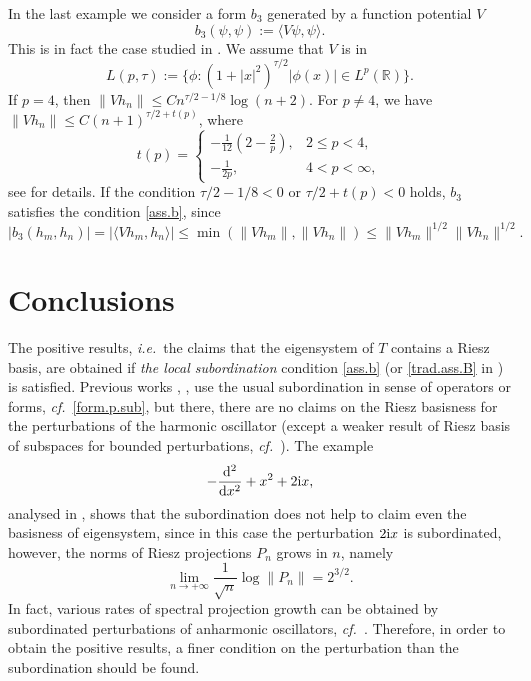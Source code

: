 In the last example we consider a form $b_3$ generated by a function potential $V$
\begin{equation}\label{V.form}
b_3(\psi,\psi):=\langle V \psi, \psi \rangle.
\end{equation}
This is in fact the case studied in \cite{Adduci-2012-10}. We assume that $V$ is in
\begin{equation*}
 L(p,\tau):= \{\phi:(1+|x|^2)^{\tau/2}|\phi(x)| \in L^p({{\mathbb{R}}}) \}.
\end{equation*}
If $p=4$, then $\|V h_n \| \leq C n^{\tau/2-1/8} \log(n+2)$. For $p\neq 4$, we have
$\|V h_n \| \leq C (n+1)^{\tau/2+t(p)}$, where
\begin{equation*}
t(p) = 
\begin{cases}
-\frac{1}{12}(2-\frac{2}{p}), & 2 \leq p <4, \\
-\frac{1}{2p}, & 4<p<\infty,
\end{cases}
\end{equation*}
see \cite[Eq.(2), Lem.5.2]{Adduci-2012-10} for details. 
If the condition $\tau/2-1/8<0$ or $\tau/2 +t(p)<0$ holds, $b_3$ satisfies the condition \eqref{ass.b}, since
\begin{equation}\label{V.form.bound}
|b_3(h_m,h_n)| = |\langle V h_m, h_n \rangle| 
\leq 
\min (\|V h_m\|,\|V h_n\|)
\leq
\|V h_m\|^{1/2} \|V h_n\|^{1/2}
.
\end{equation}

\section{Conclusions}
\label{sec.concl}

The positive results, {{\emph{i.e.}}}~the claims that the eigensystem of $T$ contains a Riesz basis, are obtained if \emph{the local subordination} condition \eqref{ass.b} (or \eqref{trad.ass.B} in \cite{Adduci-2012-10, Adduci-2012-73, Shkalikov-2010-269}) is satisfied. 
Previous works \cite{Markus-1988}, \cite{Agranovich-1994-28}, \cite{Wyss-2010-258} use the usual subordination in sense of operators or forms, {\emph{cf.}}~\eqref{form.p.sub}, but there, there are no claims on the Riesz basisness for the perturbations of the harmonic oscillator (except a weaker result of Riesz basis of subspaces for bounded perturbations, {\emph{cf.}}~\cite{Agranovich-1994-28}). The example 
$$-\frac{{{{\rm d}}}^2}{{{{\rm d}}} x^2} + x^2 + 2 {{\rm i}} x, $$
analysed in \cite{Mityagin-2013-prep}, shows that the subordination does not help to claim even the basisness of eigensystem, since in this case the perturbation $2{{\rm i}} x$ is subordinated, however, the norms of Riesz projections $P_n$ grows in $n$, namely
$$\lim_{n \to + \infty} \frac{1}{\sqrt{n}} \log \|P_n\| = 2^{3/2}.$$
In fact, various rates of spectral projection growth can be obtained by subordinated perturbations of anharmonic oscillators, {\emph{cf.}}~\cite{Mityagin-2013-prep}. Therefore, in order to obtain the positive results, a finer condition on the perturbation than the subordination should be found.

{\footnotesize


}



